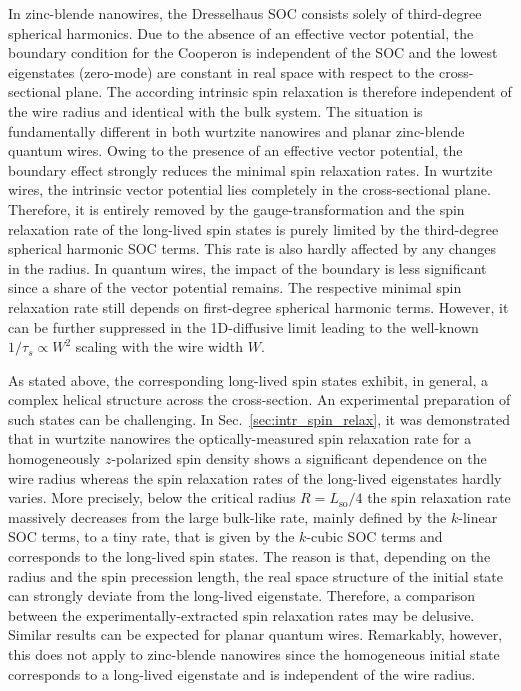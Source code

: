 \documentclass[superscriptaddress,noshowpacs,noshowkeys, twocolumn, floatfix,aps, prb,reprint]{revtex4-1}
\begin{document}
In zinc-blende nanowires, the Dresselhaus SOC consists solely of third-degree spherical harmonics.
Due to the absence of an effective vector potential, the boundary condition for the Cooperon is independent of the SOC and the lowest eigenstates (zero-mode) are constant in real space with respect to the cross-sectional plane.
The according intrinsic spin relaxation is therefore independent of the wire radius and identical with the bulk system.
The situation is fundamentally different in both wurtzite nanowires and planar zinc-blende quantum wires.
Owing to the presence of an effective vector potential, the boundary effect strongly reduces the minimal spin relaxation rates.
In wurtzite wires, the intrinsic vector potential lies completely in the cross-sectional plane.
Therefore, it is entirely removed by the gauge-transformation and the spin relaxation rate of the long-lived spin states is purely limited by the third-degree spherical harmonic SOC terms.
This rate is also hardly affected by any changes in the radius.
In quantum wires, the impact of the boundary is less significant since a share of the vector potential remains.
The respective minimal spin relaxation rate still depends on first-degree spherical harmonic terms.
However, it can be further suppressed in the 1D-diffusive limit leading to the well-known $1/\tau_s\propto W^2$ scaling with the wire width $W$.\cite{Kettemann2007a}

As stated above, the corresponding long-lived spin states exhibit, in general, a complex helical structure across the cross-section.
An experimental preparation of such states can be challenging.
In Sec.~\ref{sec:intr_spin_relax}, it was demonstrated that in wurtzite nanowires the optically-measured spin relaxation rate for a homogeneously $z$-polarized spin density shows a significant dependence on the wire radius whereas the spin relaxation rates of the long-lived eigenstates hardly varies.
More precisely, below the critical radius $R=L_\text{so}/4$ the spin relaxation rate massively decreases from the large bulk-like rate, mainly defined by the $k$-linear SOC terms, to a tiny rate, that is given by the $k$-cubic SOC terms and corresponds to the long-lived spin states. 
The reason is that, depending on the radius and the spin precession length, the real space structure of the  initial state can strongly deviate from the long-lived eigenstate.
Therefore, a comparison between the experimentally-extracted spin relaxation rates may be delusive.
Similar results can be expected for planar quantum wires.
Remarkably, however, this does not apply to zinc-blende nanowires since  the homogeneous initial state corresponds to a long-lived eigenstate and is independent of the wire radius.
\end{document}
